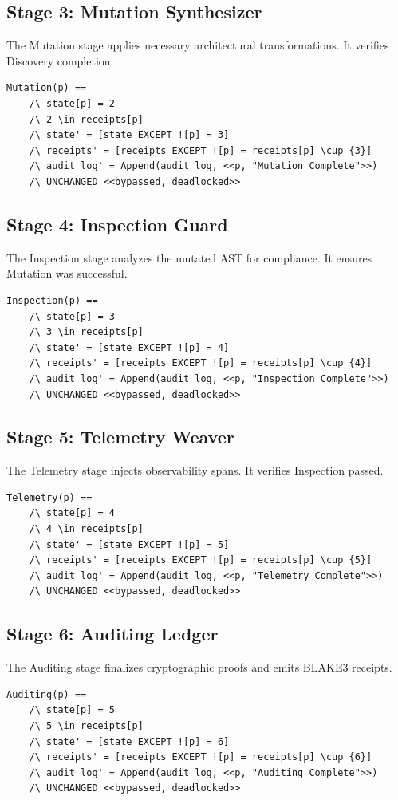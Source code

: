 \subsection{Stage 3: Mutation Synthesizer}
The Mutation stage applies necessary architectural transformations. It verifies Discovery completion.
\begin{verbatim}
Mutation(p) ==
    /\ state[p] = 2
    /\ 2 \in receipts[p]
    /\ state' = [state EXCEPT ![p] = 3]
    /\ receipts' = [receipts EXCEPT ![p] = receipts[p] \cup {3}]
    /\ audit_log' = Append(audit_log, <<p, "Mutation_Complete">>)
    /\ UNCHANGED <<bypassed, deadlocked>>
\end{verbatim}

\subsection{Stage 4: Inspection Guard}
The Inspection stage analyzes the mutated AST for compliance. It ensures Mutation was successful.
\begin{verbatim}
Inspection(p) ==
    /\ state[p] = 3
    /\ 3 \in receipts[p]
    /\ state' = [state EXCEPT ![p] = 4]
    /\ receipts' = [receipts EXCEPT ![p] = receipts[p] \cup {4}]
    /\ audit_log' = Append(audit_log, <<p, "Inspection_Complete">>)
    /\ UNCHANGED <<bypassed, deadlocked>>
\end{verbatim}

\subsection{Stage 5: Telemetry Weaver}
The Telemetry stage injects observability spans. It verifies Inspection passed.
\begin{verbatim}
Telemetry(p) ==
    /\ state[p] = 4
    /\ 4 \in receipts[p]
    /\ state' = [state EXCEPT ![p] = 5]
    /\ receipts' = [receipts EXCEPT ![p] = receipts[p] \cup {5}]
    /\ audit_log' = Append(audit_log, <<p, "Telemetry_Complete">>)
    /\ UNCHANGED <<bypassed, deadlocked>>
\end{verbatim}

\subsection{Stage 6: Auditing Ledger}
The Auditing stage finalizes cryptographic proofs and emits BLAKE3 receipts.
\begin{verbatim}
Auditing(p) ==
    /\ state[p] = 5
    /\ 5 \in receipts[p]
    /\ state' = [state EXCEPT ![p] = 6]
    /\ receipts' = [receipts EXCEPT ![p] = receipts[p] \cup {6}]
    /\ audit_log' = Append(audit_log, <<p, "Auditing_Complete">>)
    /\ UNCHANGED <<bypassed, deadlocked>>
\end{verbatim}

